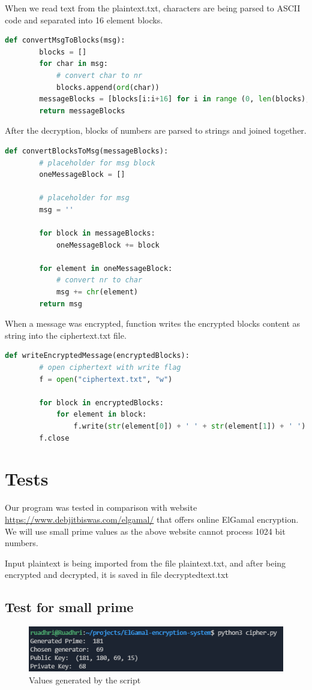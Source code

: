 \documentclass[a4paper,12pt]{article}
\begin{document}
When we read text from the plaintext.txt, characters are being parsed to ASCII code and separated into 16 element blocks.
\begin{lstlisting}[language=Python]
    def convertMsgToBlocks(msg):
        blocks = []
        for char in msg:
            # convert char to nr
            blocks.append(ord(char))
        messageBlocks = [blocks[i:i+16] for i in range (0, len(blocks), 16)]
        return messageBlocks  
\end{lstlisting}
\newpage
After the decryption, blocks of numbers are parsed to strings and joined together.
\begin{lstlisting}[language=Python]
    def convertBlocksToMsg(messageBlocks):
        # placeholder for msg block
        oneMessageBlock = []

        # placeholder for msg
        msg = ''

        for block in messageBlocks:
            oneMessageBlock += block

        for element in oneMessageBlock:
            # convert nr to char
            msg += chr(element)
        return msg 
\end{lstlisting}
When a message was encrypted, function writes the encrypted blocks content as string into the ciphertext.txt file.
\begin{lstlisting}[language=Python]
    def writeEncryptedMessage(encryptedBlocks):
        # open ciphertext with write flag
        f = open("ciphertext.txt", "w")

        for block in encryptedBlocks:
            for element in block:
                f.write(str(element[0]) + ' ' + str(element[1]) + ' ')
        f.close
\end{lstlisting}
\section{Tests}

Our program was tested in comparison with website \href{https://www.debjitbiswas.com/elgamal/}{https://www.debjitbiswas.com/elgamal/} that offers online ElGamal encryption.
We will use small prime values as the above website cannot process 1024 bit numbers.

Input plaintext is being imported from the file plaintext.txt, and after being encrypted and decrypted, it is saved in file decryptedtext.txt
\subsection{Test for small prime}
\begin{figure}[h]%
    \includegraphics{smallPrime.PNG}%
    \centering 
    \caption{Values generated by the script}%
\end{figure}%
  
\end{document}
